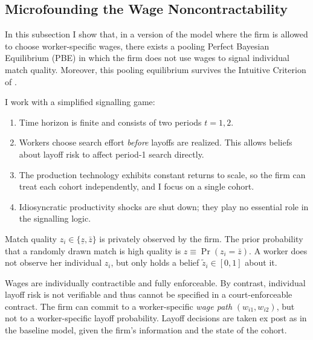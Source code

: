 \subsection{Microfounding the Wage Noncontractability}\label{microfoundation}
In this subsection I show that, in a version of the model where the firm is allowed to choose worker-specific wages, there exists a pooling Perfect Bayesian Equilibrium (PBE) in which the firm does not use wages to signal individual match quality. Moreover, this pooling equilibrium survives the Intuitive Criterion of \textcite{Cho1987}. 

I work with a simplified signalling game:

\begin{enumerate}
    \item Time horizon is finite and consists of two periods $t=1,2$.
    \item Workers choose search effort \emph{before} layoffs are realized. This allows beliefs about layoff risk to affect period-1 search directly.
    \item The production technology exhibits constant returns to scale, so the firm can treat each cohort independently, and I focus on a single cohort.
    \item Idiosyncratic productivity shocks are shut down; they play no essential role in the signalling logic.
\end{enumerate}

Match quality $z_i \in \{\underline{z},\bar{z}\}$ is privately observed by the firm. The prior probability that a randomly drawn match is high quality is $z \equiv \Pr(z_i=\bar{z})$. A worker does not observe her individual $z_i$, but only holds a belief $\tilde{z}_i \in [0,1]$ about it.

Wages are individually contractible and fully enforceable. By contrast, individual layoff risk is not verifiable and thus cannot be specified in a court-enforceable contract. The firm can commit to a worker-specific \emph{wage path} $(w_{i1},w_{i2})$, but not to a worker-specific layoff probability. Layoff decisions are taken ex post as in the baseline model, given the firm’s information and the state of the cohort.

